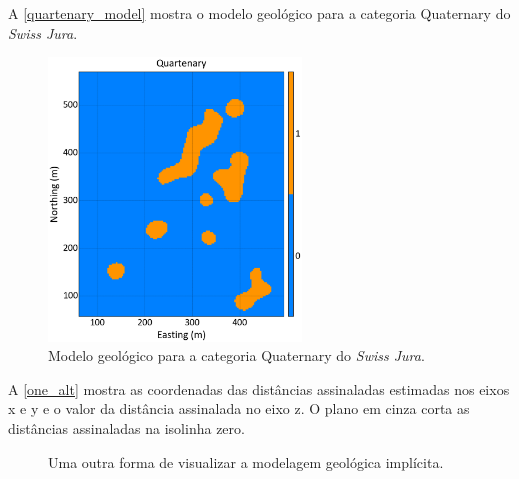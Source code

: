 A \autoref{quartenary_model} mostra o modelo geológico para a categoria Quaternary do \textit{Swiss Jura}. 

\begin{figure}[H]
	\centering
	\caption{\label{quartenary_model}Modelo geológico para a categoria Quaternary do \textit{Swiss Jura}.}
	\includegraphics[width=0.6\textwidth]{capitulo_2/imagens/geomodel_quaternary.png}
\end{figure}

A \autoref{one_alt} mostra as coordenadas das distâncias assinaladas estimadas nos eixos x e y e o valor da distância assinalada no eixo z. O plano em cinza corta as distâncias assinaladas na isolinha zero. 

\begin{figure}[H]
	\centering
	\caption{\label{one_alt}Uma outra forma de visualizar a modelagem geológica implícita.}
	\hspace{1em}
	\hspace{1em}
\end{figure}

